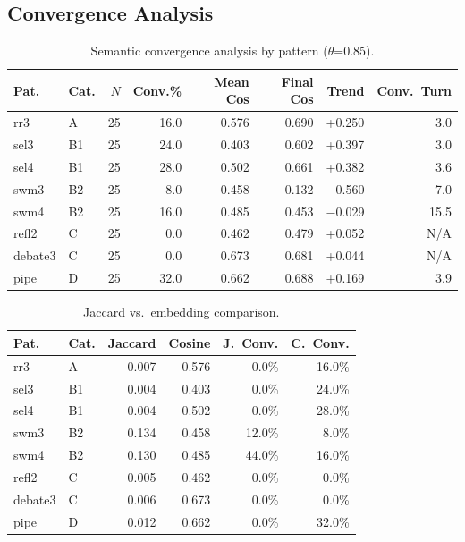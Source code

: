 \documentclass{article}
\begin{document}
\subsection{Convergence Analysis}
\label{app:convergence}

\begin{table}[H]
\centering
\caption{Semantic convergence analysis by pattern ($\theta$=0.85).}
\label{tab:convergence}
{\small
\begin{tabular}{@{}llrrrrrr@{}}
\toprule
\textbf{Pat.} & \textbf{Cat.} & $N$ & \textbf{Conv.\%} & \textbf{Mean Cos} & \textbf{Final Cos} & \textbf{Trend} & \textbf{Conv.\ Turn} \\
\midrule
rr3 & A & 25 & 16.0 & 0.576 & 0.690 & +0.250 & 3.0 \\
sel3 & B1 & 25 & 24.0 & 0.403 & 0.602 & +0.397 & 3.0 \\
sel4 & B1 & 25 & 28.0 & 0.502 & 0.661 & +0.382 & 3.6 \\
swm3 & B2 & 25 & 8.0 & 0.458 & 0.132 & $-$0.560 & 7.0 \\
swm4 & B2 & 25 & 16.0 & 0.485 & 0.453 & $-$0.029 & 15.5 \\
refl2 & C & 25 & 0.0 & 0.462 & 0.479 & +0.052 & N/A \\
debate3 & C & 25 & 0.0 & 0.673 & 0.681 & +0.044 & N/A \\
pipe & D & 25 & 32.0 & 0.662 & 0.688 & +0.169 & 3.9 \\
\bottomrule
\end{tabular}
}
\end{table}

\begin{table}[H]
\centering
\caption{Jaccard vs.\ embedding comparison.}
\label{tab:jaccard_vs_embedding}
{\small
\begin{tabular}{@{}llrrrr@{}}
\toprule
\textbf{Pat.} & \textbf{Cat.} & \textbf{Jaccard} & \textbf{Cosine} & \textbf{J.\ Conv.} & \textbf{C.\ Conv.} \\
\midrule
rr3 & A & 0.007 & 0.576 & 0.0\% & 16.0\% \\
sel3 & B1 & 0.004 & 0.403 & 0.0\% & 24.0\% \\
sel4 & B1 & 0.004 & 0.502 & 0.0\% & 28.0\% \\
swm3 & B2 & 0.134 & 0.458 & 12.0\% & 8.0\% \\
swm4 & B2 & 0.130 & 0.485 & 44.0\% & 16.0\% \\
refl2 & C & 0.005 & 0.462 & 0.0\% & 0.0\% \\
debate3 & C & 0.006 & 0.673 & 0.0\% & 0.0\% \\
pipe & D & 0.012 & 0.662 & 0.0\% & 32.0\% \\
\bottomrule
\end{tabular}
}
\end{table}
\end{document}
